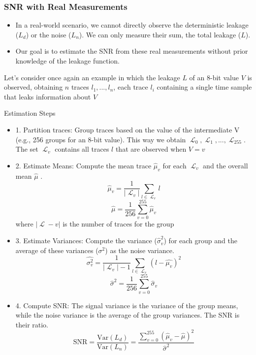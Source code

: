 \begin{frame}
    \frametitle{SNR with Real Measurements}
    \begin{block}{}
        \begin{itemize}
            \item In a real-world scenario, we cannot directly observe the deterministic leakage ($L_d$) or the noise ($L_n$). We can only measure their sum, the total leakage ($L$).
            \item Our goal is to estimate the SNR from these real measurements without prior knowledge of the leakage function.
        \end{itemize}
    \end{block}
        Let's consider once again an example in which the leakage $L$ of an 8-bit value $V$ is observed, obtaining $n$ traces $l_1, ..., l_n$, each trace $l_i$ containing a single time sample that leaks information about $V$
\end{frame}
\newcommand{\Lagr}{\mathop{\mathcal{L}}}
\begin{frame}
    \begin{block}{Estimation Steps}
        \begin{itemize}
            \item 1. Partition traces: Group traces based on the value of the intermediate V (e.g., 256 groups for an 8-bit value). This way we obtain $\Lagr_0,\Lagr_1,...,\Lagr_{255}$. The set $\Lagr_v$ contains all traces $l$ that are observed when $V=v$
            \item 2. Estimate Means: Compute the mean trace $\hat{\mu}_v$ for each $\Lagr_v$ and the overall mean $\hat{\mu}$ . $$\hat{\mu}_v=\frac{1}{|\Lagr_v|}\sum_{l \in \Lagr_v} l$$ $$\hat{\mu}=\frac{1}{256}\sum_{v=0}^{255}\hat{\mu}_v$$ where $|\Lagr-v|$ is the number of traces for the group
        \end{itemize}
    \end{block}
\end{frame}

\begin{frame}
    \begin{block}{}
        \begin{itemize}
            \item 3. Estimate Variances: Compute the variance ($\hat{\sigma}_v^2$) for each group and the average of these variances ($\sigma^2$) as the noise variance.
            $$\hat{\sigma_v^2} = \frac{1}{|\Lagr_v|-1}\sum_{l \in \Lagr_v} (l-\hat{\mu_v})^2$$
            $$\hat{\sigma}^2=\frac{1}{256}\sum_{v=0}^{255}\hat{\sigma}_v$$
            \item 4. Compute SNR: The signal variance is the variance of the group means, while the noise variance is the average of the group variances. The SNR is their ratio.
                $$
                \text{SNR} = \frac{\text{Var}(L_d)}{\text{Var}(L_n)} = \frac{\sum_{v=0}^{255}(\hat{\mu}_v - \hat{\mu})^2}{\hat{\sigma}^2}
                $$
        \end{itemize}
    \end{block}
\end{frame}



